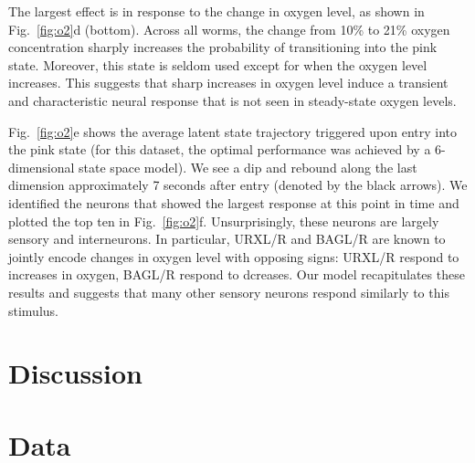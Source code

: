 \documentclass[11pt]{article}
\begin{document}
The largest effect is in response to the change in oxygen level, as
shown in Fig.~\ref{fig:o2}d (bottom).  Across all worms, the change
from 10\% to 21\% oxygen concentration sharply increases the probability
of transitioning into the pink state. Moreover, this state is seldom
used except for when the oxygen level increases.  This suggests that
sharp increases in oxygen level induce a transient and characteristic
neural response that is not seen in steady-state oxygen levels.

Fig.~\ref{fig:o2}e shows the average latent state trajectory triggered
upon entry into the pink state (for this dataset, the optimal performance
was achieved by a 6-dimensional state space model).  We see a dip and
rebound along the last dimension approximately 7 seconds after entry
(denoted by the black arrows).  We identified the neurons that showed
the largest response at this point in time and plotted the top ten
in Fig.~\ref{fig:o2}f.  Unsurprisingly, these neurons are largely sensory
and interneurons.  In particular, \textsf{URXL/R} and \textsf{BAGL/R} are
known to jointly encode changes in oxygen level with opposing signs: \textsf{URXL/R}
respond to increases in oxygen, \textsf{BAGL/R} respond to dcreases.  Our
model recapitulates these results and suggests that many other sensory
neurons respond similarly to this stimulus.

\clearpage

\section*{Discussion}

\clearpage




\clearpage

\appendix

\section{Data}
\label{sec:data}
\end{document}
